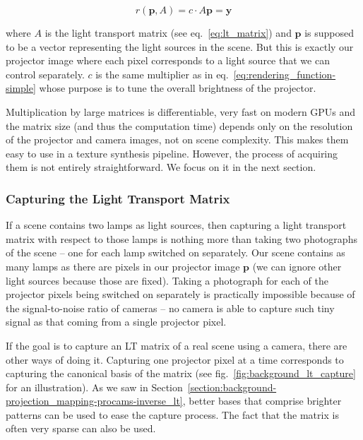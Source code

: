 \begin{equation}
    \label{eq:rendering_function-lt_matrix}
    r(\bm{p}, A) = c \cdot A\bm{p} = \bm{y}
\end{equation}

where \(A\) is the light transport matrix (see eq.~\ref{eq:lt_matrix}) and \(\bm{p}\) is supposed to be a vector representing the light sources in the scene. But this is exactly our projector image where each pixel corresponds to a light source that we can control separately. \(c\) is the same multiplier as in eq.~\ref{eq:rendering_function-simple} whose purpose is to tune the overall brightness of the projector.

Multiplication by large matrices is differentiable, very fast on modern GPUs and the matrix size (and thus the computation time) depends only on the resolution of the projector and camera images, not on scene complexity. This makes them easy to use in a texture synthesis pipeline. However, the process of acquiring them is not entirely straightforward. We focus on it in the next section.

\subsubsection{Capturing the Light Transport Matrix}
\label{section:methods-rendering_function-general-lt_capture}

If a scene contains two lamps as light sources, then capturing a light transport matrix with respect to those lamps is nothing more than taking two photographs of the scene -- one for each lamp switched on separately. Our scene contains as many lamps as there are pixels in our projector image \(\bm{p}\) (we can ignore other light sources because those are fixed). Taking a photograph for each of the projector pixels being switched on separately is practically impossible because of the signal-to-noise ratio of cameras -- no camera is able to capture such tiny signal as that coming from a single projector pixel.

If the goal is to capture an LT matrix of a real scene using a camera, there are other ways of doing it. Capturing one projector pixel at a time corresponds to capturing the canonical basis of the matrix (see fig.~\ref{fig:background_lt_capture} for an illustration). As we saw in Section~\ref{section:background-projection_mapping-procams-inverse_lt}, better bases that comprise brighter patterns can be used to ease the capture process. The fact that the matrix is often very sparse can also be used.

